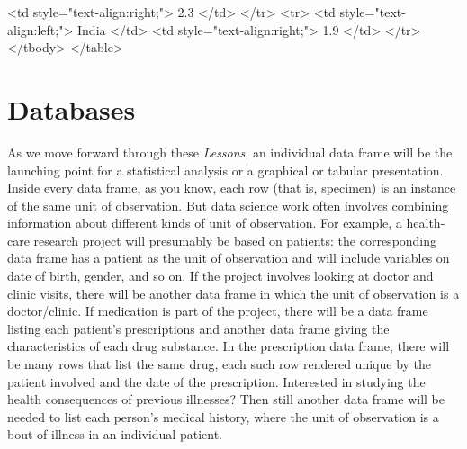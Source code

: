 \documentclass[
  letterpaper,
  DIV=11,
  numbers=noendperiod,
  oneside]{scrartcl}
\newenvironment{Shaded}{\begin{snugshade}}{\end{snugshade}}
\newcommand{\DataTypeTok}[1]{\textcolor[rgb]{0.68,0.00,0.00}{#1}}
\newcommand{\KeywordTok}[1]{\textcolor[rgb]{0.00,0.23,0.31}{#1}}
\newcommand{\NormalTok}[1]{\textcolor[rgb]{0.00,0.23,0.31}{#1}}
\newcommand{\OperatorTok}[1]{\textcolor[rgb]{0.37,0.37,0.37}{#1}}
\newcommand{\OtherTok}[1]{\textcolor[rgb]{0.00,0.23,0.31}{#1}}
\newcommand{\StringTok}[1]{\textcolor[rgb]{0.13,0.47,0.30}{#1}}
\begin{document}
\begin{Shaded}
\begin{Highlighting}[]
   \DataTypeTok{\textless{}}\KeywordTok{td}\OtherTok{ style}\OperatorTok{=}\StringTok{"text{-}align:right;"}\DataTypeTok{\textgreater{}}\NormalTok{ 2.3 }\DataTypeTok{\textless{}/}\KeywordTok{td}\DataTypeTok{\textgreater{}}
  \DataTypeTok{\textless{}/}\KeywordTok{tr}\DataTypeTok{\textgreater{}}
  \DataTypeTok{\textless{}}\KeywordTok{tr}\DataTypeTok{\textgreater{}}
   \DataTypeTok{\textless{}}\KeywordTok{td}\OtherTok{ style}\OperatorTok{=}\StringTok{"text{-}align:left;"}\DataTypeTok{\textgreater{}}\NormalTok{ India }\DataTypeTok{\textless{}/}\KeywordTok{td}\DataTypeTok{\textgreater{}}
   \DataTypeTok{\textless{}}\KeywordTok{td}\OtherTok{ style}\OperatorTok{=}\StringTok{"text{-}align:right;"}\DataTypeTok{\textgreater{}}\NormalTok{ 1.9 }\DataTypeTok{\textless{}/}\KeywordTok{td}\DataTypeTok{\textgreater{}}
  \DataTypeTok{\textless{}/}\KeywordTok{tr}\DataTypeTok{\textgreater{}}
\DataTypeTok{\textless{}/}\KeywordTok{tbody}\DataTypeTok{\textgreater{}}
\DataTypeTok{\textless{}/}\KeywordTok{table}\DataTypeTok{\textgreater{}}
\end{Highlighting}
\end{Shaded}

\newpage

\section{Databases}\label{sec-databases}

As we move forward through these \emph{Lessons}, an individual data
frame will be the launching point for a statistical analysis or a
graphical or tabular presentation. Inside every data frame, as you know,
each row (that is, specimen) is an instance of the same unit of
observation. But data science work often involves combining information
about different kinds of unit of observation. For example, a health-care
research project will presumably be based on patients: the corresponding
data frame has a patient as the unit of observation and will include
variables on date of birth, gender, and so on. If the project involves
looking at doctor and clinic visits, there will be another data frame in
which the unit of observation is a doctor/clinic. If medication is part
of the project, there will be a data frame listing each patient's
prescriptions and another data frame giving the characteristics of each
drug substance. In the prescription data frame, there will be many rows
that list the same drug, each such row rendered unique by the patient
involved and the date of the prescription. Interested in studying the
health consequences of previous illnesses? Then still another data frame
will be needed to list each person's medical history, where the unit of
observation is a bout of illness in an individual patient.
\end{document}
